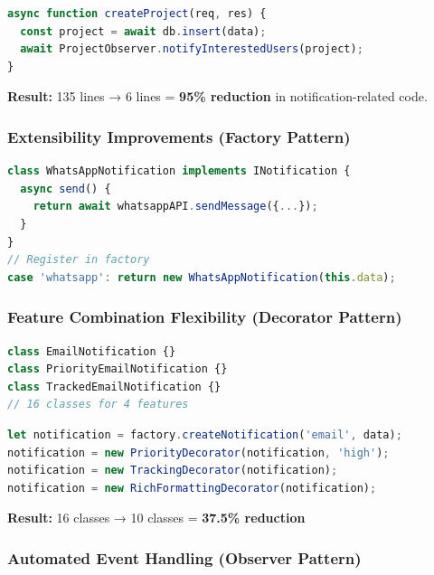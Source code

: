 \documentclass[a4paper,12pt]{report}
\begin{document}
\begin{lstlisting}[language=JavaScript,style=professional,caption={After Patterns - Using Observer + Builder},captionpos=t]
async function createProject(req, res) {
  const project = await db.insert(data);
  await ProjectObserver.notifyInterestedUsers(project);
}
\end{lstlisting}

\textbf{Result:} 135 lines → 6 lines = \textbf{95\% reduction} in notification-related code.

\subsubsection*{Extensibility Improvements (Factory Pattern)}

\begin{lstlisting}[language=JavaScript,style=professional,caption={Adding WhatsApp Channel},captionpos=t]
class WhatsAppNotification implements INotification {
  async send() {
    return await whatsappAPI.sendMessage({...});
  }
}
// Register in factory
case 'whatsapp': return new WhatsAppNotification(this.data);
\end{lstlisting}

\subsubsection*{Feature Combination Flexibility (Decorator Pattern)}

\begin{lstlisting}[language=JavaScript,style=professional,caption={Before Decorator - Class Explosion},captionpos=t]
class EmailNotification {}
class PriorityEmailNotification {}
class TrackedEmailNotification {}
// 16 classes for 4 features
\end{lstlisting}

\begin{lstlisting}[language=JavaScript,style=professional,caption={After Decorator - Flexible Composition},captionpos=t]
let notification = factory.createNotification('email', data);
notification = new PriorityDecorator(notification, 'high');
notification = new TrackingDecorator(notification);
notification = new RichFormattingDecorator(notification);
\end{lstlisting}

\textbf{Result:} 16 classes → 10 classes = \textbf{37.5\% reduction}

\subsubsection*{Automated Event Handling (Observer Pattern)}
\end{document}
